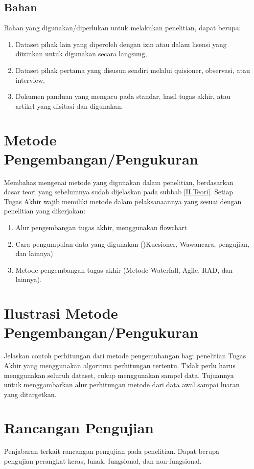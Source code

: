 \subsection{Bahan} \label{III.Bahan}
Bahan yang digunakan/diperlukan untuk melakukan penelitian, dapat berupa: \par
\begin{enumerate}[noitemsep]
	\item Dataset pihak lain yang diperoleh dengan izin atau dalam lisensi yang diizinkan untuk digunakan secara langsung,
	\item Dataset pihak pertama yang disusun sendiri melalui quisioner, observasi, atau interview,
	\item Dokumen panduan yang mengacu pada standar, hasil tugas akhir, atau artikel yang disitasi dan digunakan. 
\end{enumerate}

\section{Metode Pengembangan/Pengukuran} \label{III.Metode}
Membahas mengenai metode yang digunakan dalam penelitian, berdasarkan dasar teori yang sebelumnya sudah dijelaskan pada subbab \ref{II.Teori}. Setiap Tugas Akhir wajib memiliki metode dalam pelaksanaannya yang sesuai dengan penelitian yang dikerjakan: \par
\begin{enumerate}[noitemsep]
	\item Alur pengembangan tugas akhir, menggunakan flowchart
	\item Cara pengumpulan data yang digunakan ()Kuesioner, Wawancara, pengujian, dan lainnya)
	\item Metode pengembangan tugas akhir (Metode Waterfall, Agile, RAD, dan lainnya).
\end{enumerate}

\section{Ilustrasi Metode Pengembangan/Pengukuran} \label{III.Ilustrasi}
Jelaskan contoh perhitungan dari metode pengemubangan bagi penelitian Tugas Akhir yang menggunakan algoritma perhitungan tertentu. Tidak perlu harus menggunakan seluruh dataset, cukup menggunakan sampel data. Tujuannya untuk menggambarkan alur perhitungan metode dari data awal sampai luaran yang ditargetkan. \par

\section{Rancangan Pengujian} \label{III.Rancang Uji}
Penjabaran terkait rancangan pengujian pada penelitian. Dapat berupa pengujian perangkat keras, lunak, fungsional, dan non-fungsional.